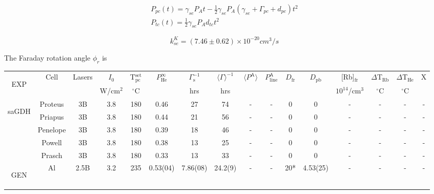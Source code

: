 \documentclass[pdftex,letterpaper,12pt]{report}
\begin{document}
	
\begin{subequations}\label{InitialSpinup}
	\begin{gather}
	P_{pc}(t)=\gamma_{se}P_{A}t-\frac{1}{2}\gamma_{se}P_{A}(\gamma_{se}+\Gamma_{pc}+d_{pc})t^{2}\\
	P_{tc}(t)=\frac{1}{2}\gamma_{se}P_{A}d_{tc}t^{2}
	\end{gather}
\end{subequations}

\begin{equation}
k_{se}^{K}=(7.46\pm 0.62)\times 10^{-20}cm^{3}/s
\end{equation}

The Faraday rotation angle $\phi_{r}$ is

\begin{table}\scriptsize
	\begin{center}
		\begin{tabular}{|c|c|ccc|ccc|ccccc|cc|c|}
			\hline
			\multirow{2}{*}{\begin{sideways}{EXP}\end{sideways}}&\multirow{2}{*}{Cell} & \multirow{2}{*}{Lasers} & $I_0$ & T$_\mathrm{pc}^\mathrm{set}$ & \multirow{2}{*}{$P_\mathrm{He}^\infty$} & $\Gamma_\mathrm{s}^{-1}$ & $\langle\Gamma\rangle^{-1}$ & \multirow{2}{*}{$\langle P^\mathrm{A} \rangle$} & \multirow{2}{*}{$P_\mathrm{line}^\mathrm{A}$} & \multirow{2}{*}{$D_\mathrm{fr}$} & \multirow{2}{*}{$D_\mathrm{pb}$} & [Rb]$_\mathrm{fr}$ & $\Delta$T$_\mathrm{Rb}$ & $\Delta$T$_\mathrm{He}$ & \multirow{2}{*}{X}\\
			&& & W/cm$^2$ & $^\circ$C & & hrs & hrs & & & & & $10^{14}$/cm$^3$ & $^\circ$C & $^\circ$C &\\
			\hline
			\hline
			\multirow{5}{*}{\begin{sideways}saGDH\end{sideways}} & Proteus & 3B & 3.8 & 180 & 0.46 & 27 & 74 & - & - & 0 & 0 & - & - & - & -\\
			\cline{2-16}
			& Priapus & 3B & 3.8 & 180 & 0.44 & 21 & 56 & - & - & 0 & 0 & - & - & - & -\\
			\cline{2-16}
			& Penelope & 3B & 3.8 & 180 & 0.39 & 18 & 46 & - & - & 0 & 0 & - & - & - & -\\
			\cline{2-16}
			& Powell & 3B & 3.8 & 180 & 0.38 & 13 & 25 & - & - & 0 & 0 & - & - & - & -\\
			\cline{2-16}
			& Prasch & 3B & 3.8 & 180 & 0.33 & 13 & 33 & - & - & 0 & 0 & - & - & - & -\\
			\hline
			\hline
			\multirow{20}{*}{\begin{sideways}GEN\end{sideways}} & \multirow{2}{*}{Al} & 2.5B & 3.2 & 235 & 0.53(04) & 7.86(08) & 24.2(9) & - & - & 20* & 4.53(25) & - & - & - & - \\

\end{tabular}
\end{center}
\end{table}
\end{document}
